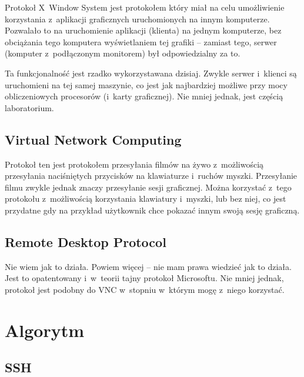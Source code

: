 \documentclass[a4paper,11pt]{article}
\begin{document}
Protokoł X~Window System jest protokołem który miał na celu umożliwienie
korzystania z~aplikacji graficznych uruchomionych na innym komputerze.
Pozwalało to na uruchomienie aplikacji (klienta) na jednym komputerze,
bez obciążania tego komputera wyświetlaniem tej grafiki -- zamiast tego,
serwer (komputer z~podłączonym monitorem) był odpowiedzialny za to.

Ta funkcjonalność jest rzadko wykorzystawana dzisiaj. Zwykle serwer
i~klienci są uruchomieni na tej samej maszynie, co jest jak najbardziej
możliwe przy mocy obliczeniowych procesorów (i~karty graficznej). Nie
mniej jednak, jest częścią laboratorium.

\subsection{Virtual Network Computing}

Protokoł ten jest protokołem przesyłania filmów na żywo z~możliwością
przesyłania naciśniętych przycisków na klawiaturze i~ruchów myszki.
Przesyłanie filmu zwykle jednak znaczy przesyłanie sesji graficznej.
Można korzystać z~tego protokołu z~możliwością korzystania klawiatury
i~myszki, lub bez niej, co jest przydatne gdy na przykład użytkownik
chce pokazać innym swoją sesję graficzną.

\subsection{Remote Desktop Protocol}

Nie wiem jak to działa. Powiem więcej -- nie mam prawa wiedzieć jak to działa.
Jest to opatentowany i~w~teorii tajny protokoł Microsoftu. Nie mniej jednak,
protokoł jest podobny do VNC w~stopniu w~którym mogę z~niego korzystać.

\section{Algorytm}

\subsection{SSH}
\end{document}
